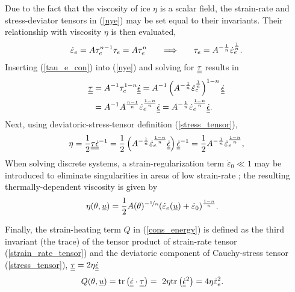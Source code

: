 Due to the fact that the viscosity of ice $\eta$ is a scalar field, the strain-rate and stress-deviator tensors in (\ref{nye}) may be set equal to their invariants.  Their relationship with  viscosity $\eta$ is then evaluated,
\begin{align}
  \label{tau_e_con}
  \dot{\varepsilon}_e = A \tau_e^{n-1} \tau_e = A \tau_e^n \hspace{5mm}
  \implies \hspace{5mm} \tau_e = A^{-\frac{1}{n}} \dot{\varepsilon}_e^{\frac{1}{n}}.
\end{align}
Inserting (\ref{tau_e_con}) into (\ref{nye}) and solving for $\underline{\underline{\tau}}$ results in
\begin{align*}
  \underline{\underline{\tau}} &= A^{-1} \tau_e^{1-n} \underline{\underline{\dot{\epsilon}}} 
       = A^{-1} \left( A^{-\frac{1}{n}} \dot{\varepsilon}_e^{\frac{1}{n}} \right)^{1-n} \underline{\underline{\dot{\epsilon}}} \\
       &= A^{-1} A^{\frac{n - 1}{n}} \dot{\varepsilon}_e^{\frac{1-n}{n}} \underline{\underline{\dot{\epsilon}}} 
       = A^{-\frac{1}{n}} \dot{\varepsilon}_e^{\frac{1-n}{n}} \underline{\underline{\dot{\epsilon}}}.
\end{align*}
Next, using deviatoric-stress-tensor definition (\ref{stress_tensor}),
\begin{align*}
  \eta = \frac{1}{2} \underline{\underline{\tau}} \underline{\underline{\dot{\epsilon}}}^{-1} 
       = \frac{1}{2} \left( A^{-\frac{1}{n}} \dot{\varepsilon}_e^{\frac{1-n}{n}} \underline{\underline{\dot{\epsilon}}} \right) \underline{\underline{\dot{\epsilon}}}^{-1} 
       = \frac{1}{2} A^{-\frac{1}{n}} \dot{\varepsilon}_e^{\frac{1-n}{n}},
\end{align*}
When solving discrete systems, a strain-regularization term $\dot{\varepsilon}_0 \ll 1$ may be introduced to eliminate singularities in areas of low strain-rate \citep{pattyn_2003}; the resulting thermally-dependent viscosity is given by
\begin{align}
  \label{viscosity}
  \eta(\theta, \underline{u}) &= \frac{1}{2}A(\theta)^{-\nicefrac{1}{n}} (\dot{\varepsilon}_e(\underline{u}) + \dot{\varepsilon}_0)^{\frac{1-n}{n}}.
\end{align} 

Finally, the strain-heating  term $Q$ in (\ref{cons_energy}) is defined as the third invariant (the trace) of the tensor product of strain-rate tensor (\ref{strain_rate_tensor}) and the deviatoric component of Cauchy-stress tensor (\ref{stress_tensor}), $\underline{\underline{\tau}} = 2\eta \underline{\underline{\dot{\epsilon}}}$ \citep{greve_2009}
\begin{align}
  \label{strain_heat}
  Q(\theta, \underline{u}) &= \mathrm{tr}\left( \underline{\underline{\dot{\epsilon}}} \cdot \underline{\underline{\tau}} \right) = \ 2 \eta \mathrm{tr}\left(\underline{\underline{\dot{\epsilon}}}^2\right) = 4 \eta \dot{\varepsilon}_e^2.
\end{align}

